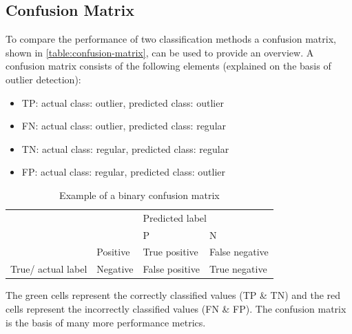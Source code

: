 \subsection{Confusion Matrix}
To compare the performance of two classification methods a confusion matrix, shown in \autoref{table:confusion-matrix}, can be used to provide an overview. A confusion matrix consists of the following elements (explained on the basis of outlier detection):
\begin{itemize}
    \item \ac{TP}: actual class: outlier, predicted class: outlier
    \item \ac{FN}: actual class: outlier, predicted class: regular
    \item \ac{TN}: actual class: regular, predicted class: regular
    \item \ac{FP}: actual class: regular, predicted class: outlier
\end{itemize}
\begin{table}[ht]
    \begin{tabular}{llll}
     &  & \multicolumn{2}{l}{Predicted label} \\ \cline{3-4} 
     & \multicolumn{1}{l|}{} & \multicolumn{1}{l|}{\ac{P}} & \multicolumn{1}{l|}{\ac{N}} \\ \cline{2-4} 
    \multicolumn{1}{l|}{} & \multicolumn{1}{l|}{Positive} & \multicolumn{1}{l|}{\cellcolor[HTML]{9AFF99}True positive} & \multicolumn{1}{l|}{\cellcolor[HTML]{FFCCC9}False negative} \\ \cline{2-4} 
    \multicolumn{1}{l|}{\multirow{-2}{*}{True/ actual label}} & \multicolumn{1}{l|}{Negative} & \multicolumn{1}{l|}{\cellcolor[HTML]{FFCCC9}False positive} & \multicolumn{1}{l|}{\cellcolor[HTML]{9AFF99}True negative} \\ \cline{2-4} 
\end{tabular}
\caption{Example of a binary confusion matrix}
\label{table:confusion-matrix}
\end{table}
The green cells represent the correctly classified values (\ac{TP} \& \ac{TN}) and the red cells represent the incorrectly classified values (\ac{FN} \& \ac{FP}). The confusion matrix is the basis of many more performance metrics.
